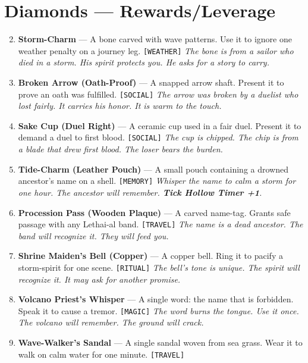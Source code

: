 \section*{Diamonds --- Rewards/Leverage}
\label{sec:lethai-al-rewards}
\begin{enumerate}
\setcounter{enumi}{1}
\item {} \textbf{Storm-Charm} --- A bone carved with wave patterns. Use it to ignore one weather penalty on a journey leg. \texttt{[WEATHER]}
  \hfill \textit{The bone is from a sailor who died in a storm. His spirit protects you. He asks for a story to carry.}
\item {} \textbf{Broken Arrow (Oath-Proof)} --- A snapped arrow shaft. Present it to prove an oath was fulfilled. \texttt{[SOCIAL]}
  \hfill \textit{The arrow was broken by a duelist who lost fairly. It carries his honor. It is warm to the touch.}
\item {} \textbf{Sake Cup (Duel Right)} --- A ceramic cup used in a fair duel. Present it to demand a duel to first blood. \texttt{[SOCIAL]}
  \hfill \textit{The cup is chipped. The chip is from a blade that drew first blood. The loser bears the burden.}
\item {} \textbf{Tide-Charm (Leather Pouch)} --- A small pouch containing a drowned ancestor's name on a shell. \texttt{[MEMORY]}
  \hfill \textit{Whisper the name to calm a storm for one hour. The ancestor will remember. \textbf{Tick Hollow Timer +1}.}
\item {} \textbf{Procession Pass (Wooden Plaque)} --- A carved name-tag. Grants safe passage with any Lethai-al band. \texttt{[TRAVEL]}
  \hfill \textit{The name is a dead ancestor. The band will recognize it. They will feed you.}
\item {} \textbf{Shrine Maiden's Bell (Copper)} --- A copper bell. Ring it to pacify a storm-spirit for one scene. \texttt{[RITUAL]}
  \hfill \textit{The bell's tone is unique. The spirit will recognize it. It may ask for another promise.}
\item {} \textbf{Volcano Priest's Whisper} --- A single word: the name that is forbidden. Speak it to cause a tremor. \texttt{[MAGIC]}
  \hfill \textit{The word burns the tongue. Use it once. The volcano will remember. The ground will crack.}
\item {} \textbf{Wave-Walker's Sandal} --- A single sandal woven from sea grass. Wear it to walk on calm water for one minute. \texttt{[TRAVEL]}

\end{enumerate}

